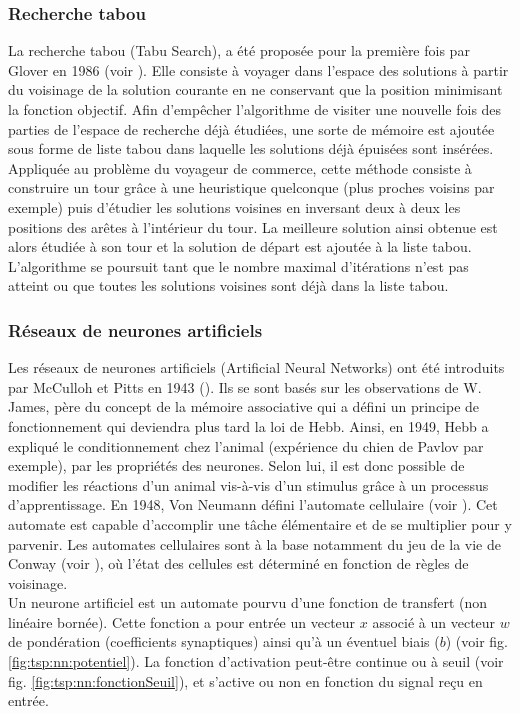 \subsubsection{Recherche tabou}
La recherche tabou (Tabu Search), a été proposée pour la première fois par Glover en 1986 (voir \cite{Glover1986}\cite{Glover1989}\cite{Glover1990}). Elle consiste à voyager dans l'espace des solutions  à partir du voisinage de la solution courante en ne conservant que la position minimisant la fonction objectif. Afin d'empêcher l'algorithme de visiter une nouvelle fois des parties de l'espace de recherche déjà étudiées, une sorte de mémoire est ajoutée sous forme de liste tabou dans laquelle les solutions déjà épuisées sont insérées. Appliquée au problème du voyageur de commerce, cette méthode consiste à construire un tour grâce à une heuristique quelconque (plus proches voisins par exemple) puis d'étudier les solutions voisines en inversant deux à deux les positions des arêtes à l'intérieur du tour. La meilleure solution ainsi obtenue est alors étudiée à son tour et la solution de départ est ajoutée à la liste tabou. L'algorithme se poursuit tant que le nombre maximal d'itérations n'est pas atteint ou que 
toutes les solutions voisines sont déjà dans la liste tabou.

\subsubsection{Réseaux de neurones artificiels}
Les réseaux de neurones artificiels (Artificial Neural Networks) ont été introduits par McCulloh et Pitts en 1943 (\cite{McCulloch1943}). Ils se sont basés sur les observations de W. James, père du concept de la mémoire associative qui a défini un principe de fonctionnement qui deviendra plus tard la loi de Hebb. Ainsi, en 1949, Hebb a expliqué le conditionnement chez l'animal (expérience du chien de Pavlov par exemple), par les propriétés des neurones. Selon lui, il est donc possible de modifier les réactions d'un animal vis-à-vis d'un stimulus grâce à un processus d'apprentissage. En 1948, Von Neumann défini l'automate cellulaire (voir \cite{Neumann1966}). Cet automate est capable d'accomplir une tâche élémentaire et de se multiplier pour y parvenir. Les automates cellulaires sont à la base notamment du jeu de la vie de Conway (voir \cite{Conway1970}), où l'état des cellules est déterminé en fonction de règles de voisinage.\\

Un neurone artificiel est un automate pourvu d'une fonction de transfert (non linéaire bornée). Cette fonction a pour entrée un vecteur $x$ associé à un vecteur $w$ de pondération (coefficients synaptiques) ainsi qu'à un éventuel biais ($b$) (voir fig. \ref{fig:tsp:nn:potentiel}). La fonction d'activation peut-être continue ou à seuil (voir fig. \ref{fig:tsp:nn:fonctionSeuil}), et s'active ou non en fonction du signal reçu en entrée.\\

